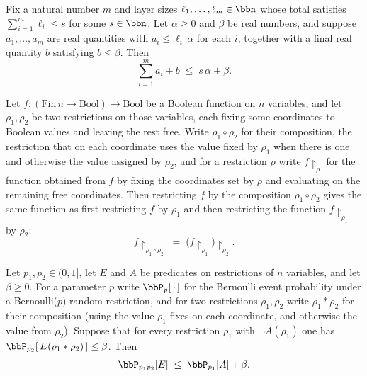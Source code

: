 \begin{theorem}
\label{LMN.full_iterative_bound}
\leanok
{}
Fix a natural number $m$ and layer sizes $\ell_1, \dots, \ell_m \in \bbn$ whose total
satisfies $\sum_{i=1}^m \ell_i \le s$ for some $s \in \bbn$. Let $\alpha \ge 0$ and
$\beta$ be real numbers, and suppose $a_1, \dots, a_m$ are real quantities with $a_i \le
\ell_i\,\alpha$ for each $i$, together with a final real quantity $b$ satisfying $b \le
\beta$. Then
\[
\sum_{i=1}^m a_i + b \;\le\; s\,\alpha + \beta.
\]
\end{theorem}

\begin{lemma}
\label{LMN.restrictFn_composeRestr'}
\leanok
{}
Let $f : (\mathrm{Fin}\,n \to \mathrm{Bool}) \to \mathrm{Bool}$ be a Boolean function on
$n$ variables, and let $\rho_1, \rho_2$ be two restrictions on those variables, each
fixing some coordinates to Boolean values and leaving the rest free. Write $\rho_1 \circ
\rho_2$ for their composition, the restriction that on each coordinate uses the value
fixed by $\rho_1$ when there is one and otherwise the value assigned by $\rho_2$, and
for a restriction $\rho$ write $f\!\restriction_\rho$ for the function obtained from $f$
by fixing the coordinates set by $\rho$ and evaluating on the remaining free
coordinates. Then restricting $f$ by the composition $\rho_1 \circ \rho_2$ gives the
same function as first restricting $f$ by $\rho_1$ and then restricting the function
$f\!\restriction_{\rho_1}$ by $\rho_2$:
\[
f\!\restriction_{\rho_1 \circ \rho_2} \;=\;
\bigl(f\!\restriction_{\rho_1}\bigr)\!\restriction_{\rho_2}.
\]
\end{lemma}

\begin{theorem}
\label{LMN.two_stage_bound'}
\leanok
{}
Let $p_1, p_2 \in (0,1]$, let $E$ and $A$ be predicates on restrictions of $n$
variables, and let $\beta \ge 0$. For a parameter $p$ write $\bbP_p[\,\cdot\,]$ for the
Bernoulli event probability under a Bernoulli($p$) random restriction, and for two
restrictions $\rho_1, \rho_2$ write $\rho_1 \ast \rho_2$ for their composition (using
the value $\rho_1$ fixes on each coordinate, and otherwise the value from $\rho_2$).
Suppose that for every restriction $\rho_1$ with $\neg A(\rho_1)$ one has
$\bbP_{p_2}\!\left[\, E(\rho_1 \ast \rho_2) \,\right] \le \beta$. Then
\[
  \bbP_{p_1 p_2}[E] \;\le\; \bbP_{p_1}[A] + \beta .
\]
\end{theorem}

